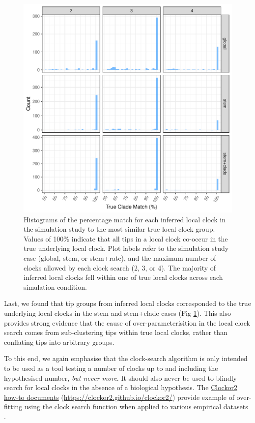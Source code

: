 \documentclass{article}
\begin{document}
\begin{figure}[H]
\centering
\includegraphics[width = 0.7\linewidth]{cladeMatch.pdf}
\caption{{Histograms of the percentage match for each inferred local clock in the simulation study to the most similar true local clock group. Values of 100\% indicate that all tips in a local clock co-occur in the true underlying local clock. Plot labels refer to the simulation study case (global, stem, or stem+rate), and the maximum number of clocks allowed by each clock search (2, 3, or 4). The majority of inferred local clocks fell within one of true local clocks across each simulation condition.}}
\label{fig:cladeMatch}
\end{figure}

{Last, we found that tip groups from inferred local clocks corresponded to the true underlying local clocks in the stem and stem+clade cases (Fig \ref{fig:cladeMatch}). This also provides strong evidence that the cause of over-parameterisition in the local clock search comes from sub-clustering tips within true local clocks, rather than conflating tips into arbitrary groups.}

To this end, we again emphasise that the clock-search algorithm is only intended to be used as a tool testing a number of clocks up to and including the hypothesised number, \emph{but never more}. It should also never be used to blindly search for local clocks in the absence of a biological hypothesis. The \href{https://clockor2.github.io/clockor2/}{Clockor2 how-to documents} (\url{https://clockor2.github.io/clockor2/}) provide example of over-fitting using the clock search function when applied to various empirical datasets \citep{porter2023evolutionary,dudas_mers-cov_2018}.
\newpage
\end{document}
